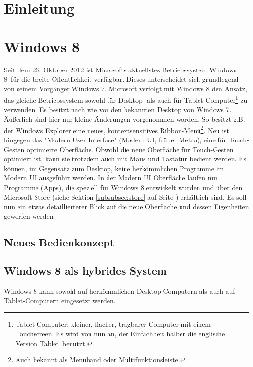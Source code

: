 \documentclass[12pt,a4paper]{scrartcl}
\author{Malte Modrow}
\begin{document}
\thispagestyle{plain}
\tableofcontents
\thispagestyle{plain}

\newpage
\section{Einleitung}
\label{sec:einleitung}
\newpage
\section{Windows 8}
\label{sec:windows8}
Seit dem 26. Oktober 2012 ist Microsofts aktuellstes Betriebssystem \glqq Windows 8\grqq\ für die breite Öffentlichkeit verfügbar. Dieses unterscheidet sich grundlegend von seinem Vorgänger \glqq Windows 7\grqq. Microsoft verfolgt mit Windows 8 den Ansatz, das gleiche Betriebssystem sowohl für Desktop- als auch für Tablet-Computer\footnote{Tablet-Computer: kleiner, flacher, tragbarer Computer mit einem Touchscreen. Es wird von nun an, der Einfachheit halber die englische Version \glqq Tablet\grqq\ benutzt.} zu verwenden. Es besitzt nach wie vor den bekannten Desktop von Windows 7. Äußerlich sind hier nur kleine Änderungen vorgenommen worden. So besitzt z.B. der Windows Explorer eine neues, kontextsensitives Ribbon-Menü\footnote{Auch bekannt als Menüband oder Multifunktionsleiste.}. Neu ist hingegen das "Modern User Interface" (Modern UI, früher Metro), eine für Touch-Gesten optimierte Oberfläche. Obwohl die neue Oberfläche für Touch-Gesten optimiert ist, kann sie trotzdem auch mit Maus und Tastatur bedient werden. Es können, im Gegensatz zum Desktop, keine herkömmlichen Programme im Modern UI ausgeführt werden. In der Modern UI Oberfläche laufen nur Programme (Apps), die speziell für Windows 8 entwickelt wurden und über den Microsoft Store (siehe Sektion \ref{subsubsec:store} auf Seite \pageref{subsubsec:store}) erhältlich sind. Es soll nun ein etwas detaillierterer Blick auf die neue Oberfläche und dessen Eigenheiten geworfen werden.
\subsection{Neues Bedienkonzept}
\label{subsec:bedienkonzept}

\subsection{Windows 8 als hybrides System}
\label{subsec:hybrides system}
Windows 8 kann sowohl auf herkömmlichen Desktop Computern als auch auf Tablet-Computern eingesetzt werden. 
\end{document}

